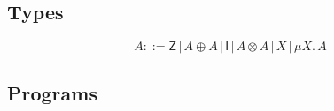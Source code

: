 \documentclass[runningheads]{llncs}
\newcommand{\Pio}{$\mathsf{\Pi}^{\mathsf{o}}$}
\newcommand{\Ty}{\mathsf{Ty}}
\newcommand{\Var}{\mathsf{Var}}
\newcommand{\Z}{\mathsf{Z}}
\newcommand{\I}{\mathsf{I}}
\begin{document}
\subsection{Types}

\[
A ::= \Z \, | \,A \oplus A \, | \,\I \,| \,A \otimes A \,| \,X \,|
\,\mu X.\,A 
\]


\subsection{Programs}
\end{document}
